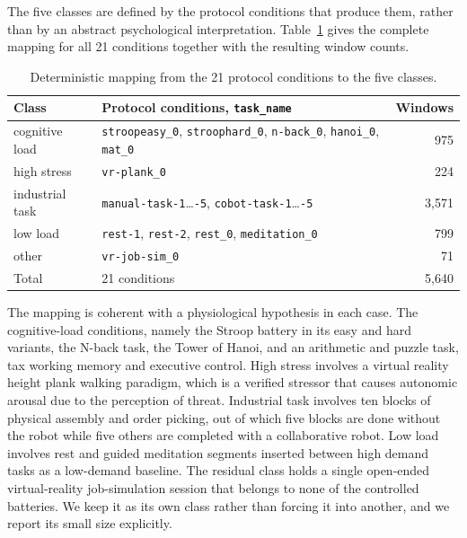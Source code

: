 \documentclass[a4paper,twoside]{article}
\begin{document}
The five classes are defined by the protocol conditions that produce them, rather than by an abstract psychological interpretation. Table~\ref{tab:labels} gives the complete mapping for all 21 conditions together with the resulting window counts.

\begin{table}[t]
    \caption{Deterministic mapping from the 21 protocol conditions to the five classes.}\label{tab:labels}
    \centering
    \footnotesize
    \begin{tabular}{@{}llr@{}}
        \toprule
        Class           & Protocol conditions, \texttt{task\_name}                                                               & Windows \\
        \midrule
        cognitive load  & \texttt{stroopeasy\_0}, \texttt{stroophard\_0}, \texttt{n-back\_0}, \texttt{hanoi\_0}, \texttt{mat\_0} & 975     \\
        high stress     & \texttt{vr-plank\_0}                                                                                   & 224     \\
        industrial task & \texttt{manual-task-1}\dots\texttt{-5}, \texttt{cobot-task-1}\dots\texttt{-5}                          & 3{,}571 \\
        low load        & \texttt{rest-1}, \texttt{rest-2}, \texttt{rest\_0}, \texttt{meditation\_0}                             & 799     \\
        other           & \texttt{vr-job-sim\_0}                                                                                 & 71      \\
        \midrule
        Total           & 21 conditions                                                                                          & 5{,}640 \\
        \bottomrule
    \end{tabular}
\end{table}

The mapping is coherent with a physiological hypothesis in each case. The cognitive-load conditions, namely the Stroop battery in its easy and hard variants, the N-back task, the Tower of Hanoi, and an arithmetic and puzzle task, tax working memory and executive control. High stress involves a virtual reality height plank walking paradigm, which is a verified stressor that causes autonomic arousal due to the perception of threat. Industrial task involves ten blocks of physical assembly and order picking, out of which five blocks are done without the robot while five others are completed with a collaborative robot. Low load involves rest and guided meditation segments inserted between high demand tasks as a low-demand baseline. The residual class holds a single open-ended virtual-reality job-simulation session that belongs to none of the controlled batteries. We keep it as its own class rather than forcing it into another, and we report its small size explicitly.
\end{document}

